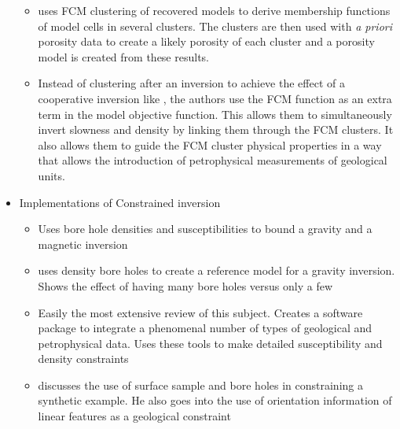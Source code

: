 \begin{itemize}
\begin{itemize}
	\item \cite{paasche2006integration} uses FCM clustering of recovered models to derive membership functions of model cells in several clusters. The clusters are then used with \emph{a priori} porosity data to create a likely porosity of each cluster and a porosity model is created from these results.
	\item \cite{sun2015multidomain} Instead of clustering after an inversion to achieve the effect of a cooperative inversion like \cite{paasche2006integration}, the authors use the FCM function as an extra term in the model objective function. This allows them to simultaneously invert slowness and density by linking them through the FCM clusters. It also allows them to guide the FCM cluster physical properties in a way that allows the introduction of petrophysical measurements of geological units.
\end{itemize}
\item Implementations of Constrained inversion
\begin{itemize}
	\item \cite{phillips2001thesis} Uses bore hole densities and susceptibilities to bound a gravity and a magnetic inversion	
	\item \cite{farquharson2008geologically} uses density bore holes to create a reference model for a gravity inversion. Shows the effect of having many bore holes versus only a few
	\item \cite{williams2008geologically} Easily the most extensive review of this subject. Creates a software package to integrate a phenomenal number of types of geological and petrophysical data. Uses these tools to make detailed susceptibility and density constraints
	\item \cite{Lelievre2009Integrating} discusses the use of surface sample and bore holes in constraining a synthetic example. He also goes into the use of orientation information of linear features as a geological constraint
	
	

\end{itemize}
\end{itemize}





\endinput

 Interestingly, the assumption that all magnetizations are in the same direction also assumes that all Koenigsberger ratios are equal.

Any text after an \endinput is ignored.
You could put scraps here or things in progress.

